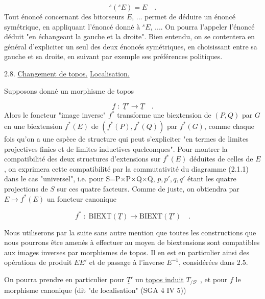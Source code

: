 \begin{equation*}
{}^{s}({}^{s}E) = E \quad .
\end{equation*}
Tout énoncé concernant des bitorseurs $E$, ... permet de déduire un énoncé symétrique, en appliquant l'énoncé donné à $^{s}E$, .... On pourra l'appeler l'énoncé déduit "en échangeant la gauche et la droite". Bien entendu, on se contentera en général d'expliciter un seul des deux énoncés symétriques, en choisissant entre sa gauche et sa droite, en suivant par exemple ses préférences politiques.


2.8.  \underline{Changement de topos.} \underline{Localisation.}

Supposons donné un morphisme de topos

\begin{equation*}
f \;:\; \underline{T}' \longrightarrow \underline{T} \quad .
\end{equation*}
Alors le foncteur "image inverse" $f^{*}$ transforme une biextension de $(P,Q)$ par $G$ en une biextension $f^{*}(E)$ de $(f^{*}(P),f^{*}(Q))$ par $f^{*}(G)$, comme chaque fois qu'on a une espèce de structure qui peut s'expliciter "en termes de limites projectives finies et de limites inductives quelconques". Pour montrer la compatibilité des deux structures d'extensions sur $f^{*}(E)$ déduites de celles de $E$, on exprimera cette compatibilité par la commutativité du diagramme (2.1.1) dans le cas "universel", i.e. pour S=P$\times$P$\times$Q$\times$Q, $p,p',q,q'$ étant les quatre projections de $S$ sur ces quatre facteurs. Comme de juste, on obtiendra par $E \longmapsto f^{*}(E)$ un foncteur canonique

\begin{equation*}
f^{*} \;:\; \mathrm{BIEXT}(\underline{T}) \longrightarrow \mathrm{BIEXT}(\underline{T}') \quad .
\end{equation*}




Nous utiliserons par la suite sans autre mention que toutes les constructions que nous pourrons être amenés à effectuer au moyen de biextensions sont compatibles aux images inverses par morphismes de topos. Il en est en particulier ainsi des opérations de produit $EE'$ et de passage à l'inverse $E^{-1}$, considérées dans 2.5.

On pourra prendre en particulier pour $\underline{T}'$ un \underline{topos induit} $T_{/S'}$ , et pour $f$ le morphisme canonique (dit "de localisation" (SGA 4 IV 5))

